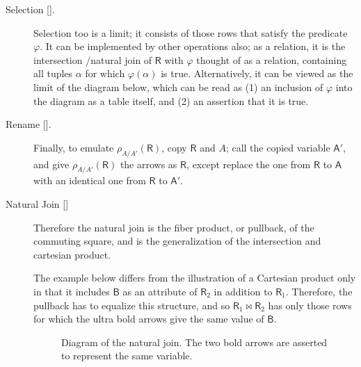 \documentclass{article}
\theoremstyle{definition}
\theoremstyle{remark}
\newcommand{\var}[1]{\mathsf{#1}}
\newlength\todolength
\newcommand{\todo}[1]{
		\colorbox{red!60!black}{\parbox{\todolength}{\color{white}$\mathrlap{\textbf{todo}}${\hspace{0.12ex}}\textbf{todo}: #1}}
}
\begin{document}
\begin{description}
\item[{Selection [].}]
Selection too is a limit; it consists of those rows that satisfy the predicate $\varphi$. 
It can be implemented by other operations also; as a relation, it is the intersection /natural join of $\var R$ with $\varphi$ thought of as a relation, containing all tuples $\alpha$ for which $\varphi(\alpha)$ is true. Alternatively, it can be viewed as the limit of the diagram below, which can be read as (1) an inclusion of $\varphi$ into the diagram as a table itself, and (2) an assertion that it is true.

\item[{Rename [].}]
Finally, to emulate $\rho_{A/A'}(\var R)$, copy $\var R$ and $A$; call the copied variable $\var A'$, and give $\rho_{A/A'}(\var R)$ the arrows as $\var R$, except replace the one from $\var R$ to $\var A$ with an identical one from $\var R$ to $\var A'$. 




\item[{Natural Join []}]

Therefore the natural join is the fiber product, or pullback, of the commuting square, and is the generalization of the intersection and cartesian product.

The example below differs from the illustration of a Cartesian product only in that it includes $\var B$ as an attribute of $\var R_2$ in addition to $\var R_1$. Therefore, the pullback has to equalize this structure, and so $\var R_1 \bowtie \var R_2$ has only those rows for which the ultra bold arrows give the same value of $\var B$. 
\begin{figure}
	\centering
\caption{Diagram of the natural join. The two bold arrows are asserted to represent the same variable.}\label{fig:natjoin}
\end{figure}
\end{description}
\end{document}
